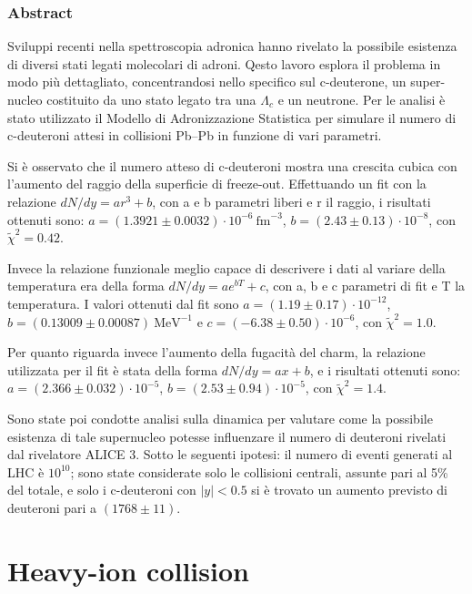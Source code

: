 \documentclass[12pt,a4paper]{book}
\begin{document}
	\newpage
	
	\subsection*{Abstract}
	Sviluppi recenti nella spettroscopia adronica hanno rivelato la possibile esistenza di diversi stati legati molecolari di adroni. Qesto lavoro esplora il problema in modo più dettagliato, concentrandosi nello specifico sul c-deuterone, un super-nucleo costituito da uno stato legato tra una $\Lambda_c$ e un neutrone. Per le analisi è stato utilizzato il Modello di Adronizzazione Statistica per simulare il numero di c-deuteroni attesi in collisioni Pb–Pb in funzione di vari parametri.
	
	Si è osservato che il numero atteso di c-deuteroni mostra una crescita cubica con l’aumento del raggio della superficie di freeze-out. Effettuando un fit con la relazione $dN/dy = ar^3 + b$, con a e b parametri liberi e r il raggio, i risultati ottenuti sono: $a = (1.3921 \pm 0.0032) \cdot 10^{-6}\ \text{fm}^{-3}$, $b = (2.43 \pm 0.13) \cdot 10^{-8}$, con $\tilde{\chi}^2 = 0.42$.
	
	Invece la relazione funzionale meglio capace di descrivere i dati al variare della temperatura era della forma $dN/dy = ae^{bT} + c$, con a, b e c parametri di fit e T la temperatura. I valori ottenuti dal fit sono $a = (1.19 \pm 0.17) \cdot 10^{-12}$, $b = (0.13009 \pm 0.00087)\ \text{MeV}^{-1}$ e $c = (-6.38 \pm 0.50) \cdot 10^{-6}$, con $\tilde{\chi}^2 = 1.0$.
	
	Per quanto riguarda invece l’aumento della fugacità del charm, la relazione utilizzata per il fit è stata della forma $dN/dy = ax + b$, e i risultati ottenuti sono: $a = (2.366 \pm 0.032) \cdot 10^{-5}$, $b = (2.53 \pm 0.94) \cdot 10^{-5}$, con $\tilde{\chi}^2 = 1.4$.
	
	Sono state poi condotte analisi sulla dinamica per valutare come la possibile esistenza di tale supernucleo potesse influenzare il numero di deuteroni rivelati dal rivelatore ALICE 3. Sotto le seguenti ipotesi: il numero di eventi generati al LHC è $10^{10}$; sono state considerate solo le collisioni centrali, assunte pari al 5\% del totale, e solo i c-deuteroni con $|y| < 0.5$ si è trovato un aumento previsto di deuteroni pari a $(1768 \pm 11)$.
	
	
	\tableofcontents  %
	
	\chapter{Heavy-ion collision}
\end{document}
